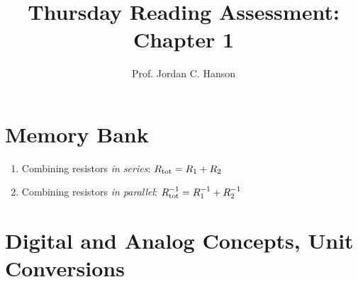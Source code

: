 \documentclass{article}
\begin{document}
\title{Thursday  Reading Assessment: Chapter 1}
\author{Prof. Jordan C. Hanson}

\maketitle

\section{Memory Bank}

\begin{enumerate}
\item Combining resistors \textit{in series}: $R_{\rm tot} = R_1 + R_2$
\item Combining resistors \textit{in parallel}: $R_{\rm tot}^{-1} = R_1^{-1} + R_2^{-1}$
\end{enumerate}

\section{Digital and Analog Concepts, Unit Conversions}
\end{document}
